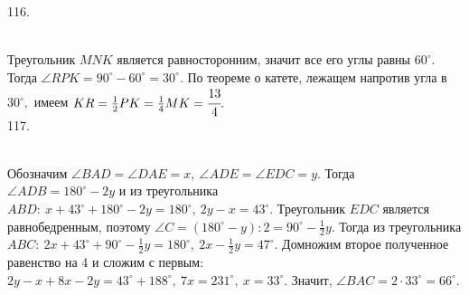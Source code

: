 \documentclass[12pt]{article}
\begin{document}
116. \begin{figure}[ht!]
\end{figure}\\
Треугольник $MNK$ является равносторонним, значит все его углы равны $60^\circ.$ Тогда $\angle RPK=90^\circ-60^\circ=30^\circ.$ По теореме о катете, лежащем напротив угла в $30^\circ,$ имеем $KR=\frac{1}{2}PK=\frac{1}{4}MK=\cfrac{13}{4}.$\\
117. \begin{figure}[ht!]
\end{figure}\\
Обозначим $\angle BAD=\angle DAE=x,\ \angle ADE=\angle EDC=y.$ Тогда $\angle ADB=180^\circ-2y$ и из треугольника $ABD:\ x+43^\circ+180^\circ-2y=180^\circ,\ 2y-x=43^\circ.$ Треугольник $EDC$ является равнобедренным, поэтому $\angle C=(180^\circ-y):2=90^\circ-\frac{1}{2}y.$ Тогда из треугольника $ABC:\ 2x+43^\circ+90^\circ-\frac{1}{2}y=180^\circ,\ 2x-\frac{1}{2}y=47^\circ.$ Домножим второе полученное равенство на 4 и сложим с первым: $2y-x+8x-2y=43^\circ+188^\circ,\ 7x=231^\circ,\ x=33^\circ.$ Значит, $\angle BAC=2\cdot33^\circ=66^\circ.$\newpage\noindent
\end{document}
